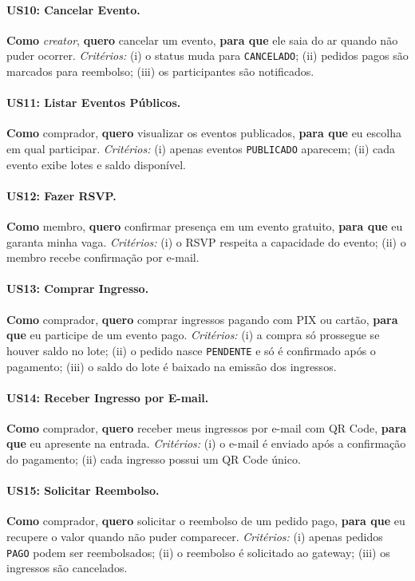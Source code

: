 \documentclass[12pt, a4paper]{article}
\begin{document}
\paragraph{US10: Cancelar Evento.}
\textbf{Como} \textit{creator}, \textbf{quero} cancelar um evento,
\textbf{para que} ele saia do ar quando não puder ocorrer. \textit{Critérios:}
(i) o status muda para \texttt{CANCELADO}; (ii) pedidos pagos são marcados para
reembolso; (iii) os participantes são notificados.

\paragraph{US11: Listar Eventos Públicos.}
\textbf{Como} comprador, \textbf{quero} visualizar os eventos publicados,
\textbf{para que} eu escolha em qual participar. \textit{Critérios:} (i) apenas
eventos \texttt{PUBLICADO} aparecem; (ii) cada evento exibe lotes e saldo
disponível.

\paragraph{US12: Fazer RSVP.}
\textbf{Como} membro, \textbf{quero} confirmar presença em um evento gratuito,
\textbf{para que} eu garanta minha vaga. \textit{Critérios:} (i) o RSVP respeita
a capacidade do evento; (ii) o membro recebe confirmação por e-mail.

\paragraph{US13: Comprar Ingresso.}
\textbf{Como} comprador, \textbf{quero} comprar ingressos pagando com PIX ou
cartão, \textbf{para que} eu participe de um evento pago. \textit{Critérios:}
(i) a compra só prossegue se houver saldo no lote; (ii) o pedido nasce
\texttt{PENDENTE} e só é confirmado após o pagamento; (iii) o saldo do lote é
baixado na emissão dos ingressos.

\paragraph{US14: Receber Ingresso por E-mail.}
\textbf{Como} comprador, \textbf{quero} receber meus ingressos por e-mail com
QR Code, \textbf{para que} eu apresente na entrada. \textit{Critérios:} (i) o
e-mail é enviado após a confirmação do pagamento; (ii) cada ingresso possui um
QR Code único.

\paragraph{US15: Solicitar Reembolso.}
\textbf{Como} comprador, \textbf{quero} solicitar o reembolso de um pedido pago,
\textbf{para que} eu recupere o valor quando não puder comparecer.
\textit{Critérios:} (i) apenas pedidos \texttt{PAGO} podem ser reembolsados;
(ii) o reembolso é solicitado ao gateway; (iii) os ingressos são cancelados.
\end{document}
